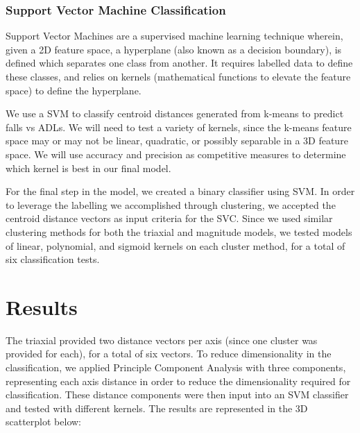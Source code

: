\documentclass{llncs}
\begin{document}
\subsubsection{Support Vector Machine Classification} 

	Support Vector Machines are a supervised machine learning technique wherein, given a 2D feature space, a hyperplane (also known as a decision boundary), is defined which separates one class from another. It requires labelled data to define these classes, and relies on kernels (mathematical functions to elevate the feature space) to define the hyperplane.

	We use a SVM to classify centroid distances generated from k-means to predict falls vs ADLs. We will need to test a variety of kernels, since the k-means feature space may or may not be linear, quadratic, or possibly separable in a 3D feature space. We will use accuracy and precision as competitive measures to determine which kernel is best in our final model.

    For the final step in the model, we created a binary classifier using SVM. In order to leverage the labelling we accomplished through clustering, we accepted the centroid distance vectors as input criteria for the SVC. Since we used similar clustering methods for both the triaxial and magnitude models, we tested models of linear, polynomial, and sigmoid kernels on each cluster method, for a total of six classification tests. 
    
\section{Results}
    
    The triaxial provided two distance vectors per axis (since one cluster was provided for each), for a total of six vectors. To reduce dimensionality in the classification, we applied Principle Component Analysis with three components, representing each axis distance in order to reduce the dimensionality required for classification. These distance components were then input into an SVM classifier and tested with different kernels. The results are represented in the 3D scatterplot below:
        
    
\end{document}
